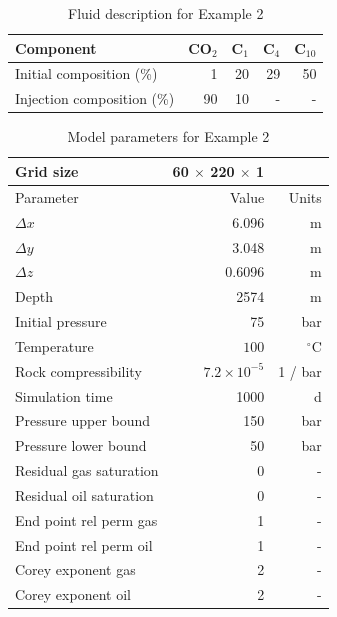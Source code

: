 \documentclass[twocolumn,numbook]{svjour3}          %
\begin{document}
%
\begin{table}
\centering
\caption{Fluid description for Example 2}
\begin{tabular}{|l|r|r|r|r|}
\hline
Component            & CO$_2$ & C$_1$ & C$_4$ & C$_{10}$    \\
\hline
Initial composition (\%)  & 1    & 20  & 29    & 50 \\
Injection composition (\%)& 90   & 10 & - & - \\
\hline
\end{tabular}
\label{table:fluidForSPE10TopLayer}
\end{table}
%


\begin{table}
\centering
\caption{Model parameters for Example 2}
\begin{tabular}{|l|rr|}
\hline
Grid size                & 60 $\times$ 220 $\times$ 1 &       \\
\hline\hline
Parameter                & Value    & Units \\
\hline
$\Delta x$               & 6.096&m          \\
$\Delta y$               & 3.048&m          \\
$\Delta z$               & 0.6096&m         \\
Depth                    & 2574&m           \\
Initial pressure         & 75  & bar        \\
Temperature              &$100$ & $^\circ$C     \\
\hline
Rock compressibility     & $7.2 \times 10^{-5}$ & 1 / bar \\
Simulation time          &1000 & d          \\
Pressure upper bound     & 150 & bar        \\
Pressure lower bound     &  50 & bar        \\
\hline
Residual gas saturation  & 0 & -            \\
Residual oil saturation  & 0 & -            \\
End point rel perm gas   & 1 & -            \\
End point rel perm oil   & 1 & -            \\
Corey exponent gas       & 2 & -            \\
Corey exponent oil       & 2 & -            \\

\end{tabular}
\end{table}
\end{document}
